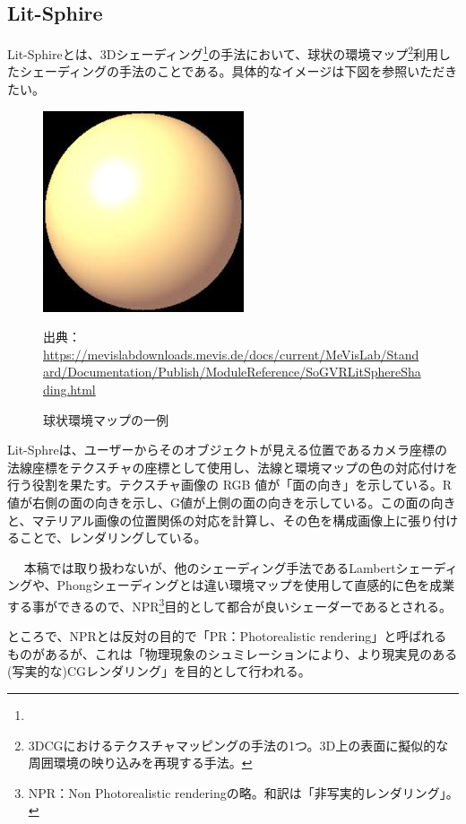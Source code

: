 \documentclass[dvipdfmx]{jsarticle}
\begin{document}
\subsection{Lit-Sphire}
Lit-Sphireとは、3Dシェーディング\footnote{}の手法において、球状の環境マップ\footnote{3DCGにおけるテクスチャマッピングの手法の1つ。3D上の表面に擬似的な周囲環境の映り込みを再現する手法。}利用したシェーディングの手法のことである。具体的なイメージは下図を参照いただきたい。
\begin{figure}[H]
  \centering
  \includegraphics[scale=0.4]{images/lit_demo.png}
  \caption{球状環境マップの一例}
  出典：\url{https://mevislabdownloads.mevis.de/docs/current/MeVisLab/Standard/Documentation/Publish/ModuleReference/SoGVRLitSphereShading.html}
\end{figure}
Lit-Sphreは、ユーザーからそのオブジェクトが見える位置であるカメラ座標の法線座標をテクスチャの座標として使用し、法線と環境マップの色の対応付けを行う役割を果たす。テクスチャ画像の RGB 値が「面の向き」を示している。R 値が右側の面の向きを示し、G値が上側の面の向きを示している。この面の向きと、マテリアル画像の位置関係の対応を計算し、その色を構成画像上に張り付けることで、レンダリングしている。\par　
本稿では取り扱わないが、他のシェーディング手法であるLambertシェーディングや、Phongシェーディングとは違い環境マップを使用して直感的に色を成業する事ができるので、NPR\footnote{NPR：Non Photorealistic renderingの略。和訳は「非写実的レンダリング」。}目的として都合が良いシェーダーであるとされる。\par
ところで、NPRとは反対の目的で「PR：Photorealistic rendering」と呼ばれるものがあるが、これは「物理現象のシュミレーションにより、より現実見のある(写実的な)CGレンダリング」を目的として行われる。
\end{document}
